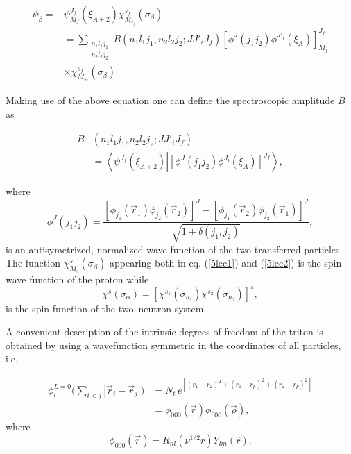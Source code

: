 \begin{subappendices}
\begin{equation}\label{5lec2}
\begin{split}
\psi_\beta=& \psi_{M_f}^{J_f}(\xi_{A+2}) \chi^{s_f}_{M_{s_f}}(\sigma_\beta)\\
&=\sum_{\substack{n_1 l_1 j_1\\n_2 l_2 j_2}} B(n_1 l_1 j_1,n_2 l_2 j_2;JJ'_iJ_f)
\left[ \phi^J(j_1 j_2) \phi^{J'_i}(\xi_A)\right]^{J_f}_{M_f}\\
&\times \chi^{s_f}_{M_{s_f}}(\sigma_\beta)
\end{split}
\end{equation}

Making use of the above equation one can define the spectroscopic amplitude $B$ as

\begin{equation}\label{5lec3}
\begin{split}
B&(n_1 l_1 j_1,n_2 l_2 j_2;JJ'_iJ_f)\\
&=\left\langle  \psi^{J_f}(\xi_{A+2})\left |\left[ \phi^J(j_1 j_2) \phi^{J_i}(\xi_A)\right]^{J_f}\right. \right\rangle,
\end{split}
\end{equation}

where
\begin{equation}\label{5lec4}
\phi^J(j_1 j_2)=\frac{\left[ \phi_{j_1}(\vec r_1) \phi_{j_2}(\vec r_2)\right]^{J}-
\left[ \phi_{j_1}(\vec r_2) \phi_{j_2}(\vec r_1)\right]^{J}}{\sqrt{1+\delta(j_1,j_2)}},
\end{equation}
is an antisymetrized, normalized wave function of the two transferred particles. The function $\chi^{s}_{M_{s}}(\sigma_\beta)$ appearing  both in eq. (\ref{5lec1}) and (\ref{5lec2}) is the spin wave function of the proton while 
\begin{equation}\label{5lec5}
\chi^{s}(\sigma_\alpha)=\left[ \chi^{s_1}(\sigma_{n_1}) \chi^{s_2}(\sigma_{n_2})\right]^{s},
\end{equation}
is the spin function of the two--neutron system.


A convenient description of the intrinsic  degrees of freedom of the triton is obtained by using a wavefunction symmetric in the coordinates of all particles, i.e.

\begin{equation}\label{5lec6}
\begin{split}
\phi_t^{L=0}\bigl(\sum_{i<j}|\vec r_i-\vec r_j|\bigr)&=N_t\,e^{[(r_1-r_2)^2+(r_1-r_p)^2+(r_2-r_p)^2]}\\
&=\phi_{000}(\vec r)\phi_{000}(\vec \rho),
\end{split}
\end{equation}
where
\begin{equation}
\phi_{000}(\vec r)=R_{nl}(\nu^{1/2 }r) Y_{lm}(\hat r).
\end{equation}


\end{subappendices}
